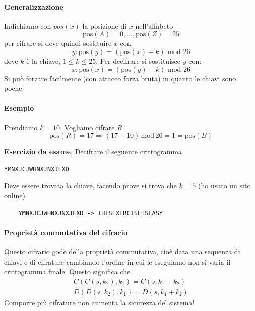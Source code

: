 \paragraph{Generalizzazione} Indichiamo con $pos(x)$ la posizione di $x$ nell'alfabeto
\[\text{pos}(A)=0,\dots,\text{pos}(Z)=25\]
per cifrare si deve quindi sostituire $x$ con:
$$ y : \text{pos}(y) = \left(\text{pos}(x) + k\right) \text{ mod } 26 $$
dove $k$ è la chiave, $1\leq k \leq 25$. Per decifrare si sostituisce $y$ con:
$$ x : \text{pos}(x) = \left(\text{pos}(y) - k\right) \text{ mod } 26 $$Si può forzare facilmente (con attacco forza bruta) in quanto le chiavi sono poche. 
\paragraph{Esempio} Prendiamo $k=10$. Vogliamo cifrare $R$
\[\text{pos}(R)=17 \Longrightarrow (17+10)\,\text{mod}\,26=1=\text{pos}(B)\]
\begin{framed}
 \noindent \textbf{Esercizio da esame}, Decifrare il seguente crittogramma
	\begin{verbatim}YMNXJCJWHNXJNXJFXD\end{verbatim}
Deve essere trovata la chiave, facendo prove si trova che $k=5$ (ho usato un sito online)
\begin{verbatim}
	YMNXJCJWHNXJNXJFXD -> THISEXERCISEISEASY
\end{verbatim}
\end{framed}
\paragraph{Proprietà commutativa del cifrario} 
Questo cifrario gode della proprietà commutativa, cioè data una sequenza di chiavi e di cifrature cambiando l'ordine in cui le eseguiamo non si varia il crittogramma finale. Questo significa che
\begin{align*}
	C(C(s, k_2), k_1) = C(s, k_1 + k_2)\\
	D(D(s, k_2), k_1) = D(s, k_1 + k_2)
\end{align*}
Comporre più cifrature non aumenta la sicurezza del sistema!



